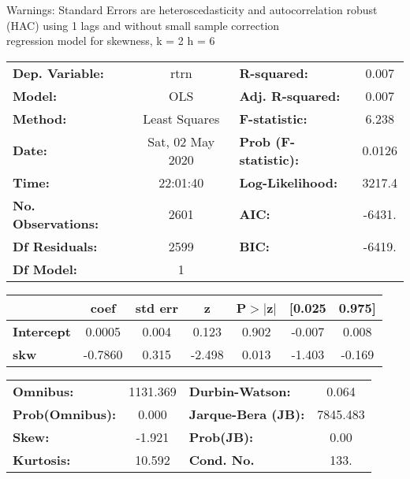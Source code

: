 Warnings: \newline
 [1] Standard Errors are heteroscedasticity and autocorrelation robust (HAC) using 1 lags and without small sample correction\\ 

regression model for skewness, k = 2 h = 6\begin{center}
\begin{tabular}{lclc}
\toprule
\textbf{Dep. Variable:}    &       rtrn       & \textbf{  R-squared:         } &     0.007   \\
\textbf{Model:}            &       OLS        & \textbf{  Adj. R-squared:    } &     0.007   \\
\textbf{Method:}           &  Least Squares   & \textbf{  F-statistic:       } &     6.238   \\
\textbf{Date:}             & Sat, 02 May 2020 & \textbf{  Prob (F-statistic):} &   0.0126    \\
\textbf{Time:}             &     22:01:40     & \textbf{  Log-Likelihood:    } &    3217.4   \\
\textbf{No. Observations:} &        2601      & \textbf{  AIC:               } &    -6431.   \\
\textbf{Df Residuals:}     &        2599      & \textbf{  BIC:               } &    -6419.   \\
\textbf{Df Model:}         &           1      & \textbf{                     } &             \\
\bottomrule
\end{tabular}
\begin{tabular}{lcccccc}
                   & \textbf{coef} & \textbf{std err} & \textbf{z} & \textbf{P$> |$z$|$} & \textbf{[0.025} & \textbf{0.975]}  \\
\midrule
\textbf{Intercept} &       0.0005  &        0.004     &     0.123  &         0.902        &       -0.007    &        0.008     \\
\textbf{skw}       &      -0.7860  &        0.315     &    -2.498  &         0.013        &       -1.403    &       -0.169     \\
\bottomrule
\end{tabular}
\begin{tabular}{lclc}
\textbf{Omnibus:}       & 1131.369 & \textbf{  Durbin-Watson:     } &    0.064  \\
\textbf{Prob(Omnibus):} &   0.000  & \textbf{  Jarque-Bera (JB):  } & 7845.483  \\
\textbf{Skew:}          &  -1.921  & \textbf{  Prob(JB):          } &     0.00  \\
\textbf{Kurtosis:}      &  10.592  & \textbf{  Cond. No.          } &     133.  \\
\bottomrule
\end{tabular}
\end{center}

